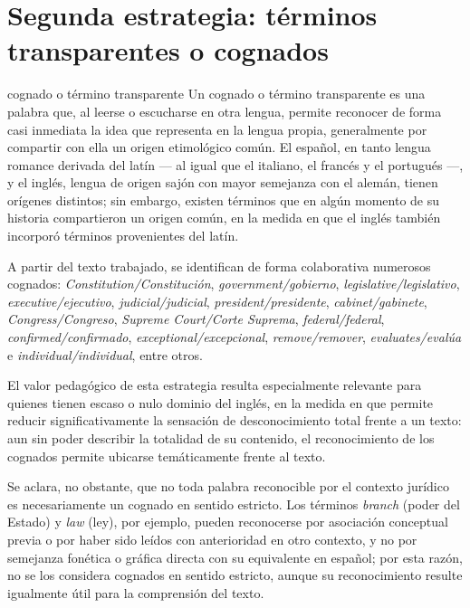 \documentclass[12pt,oneside]{book}
\begin{document}
\section{Segunda estrategia: términos transparentes o cognados}

\begin{definition}{cognado o término transparente}
Un cognado o término transparente es una palabra que, al leerse o escucharse en otra lengua, permite reconocer de forma casi inmediata la idea que representa en la lengua propia, generalmente por compartir con ella un origen etimológico común. El español, en tanto lengua romance derivada del latín --- al igual que el italiano, el francés y el portugués ---, y el inglés, lengua de origen sajón con mayor semejanza con el alemán, tienen orígenes distintos; sin embargo, existen términos que en algún momento de su historia compartieron un origen común, en la medida en que el inglés también incorporó términos provenientes del latín.
\end{definition}

A partir del texto trabajado, se identifican de forma colaborativa numerosos cognados: \textit{Constitution/Constitución}, \textit{government/gobierno}, \textit{legislative/legislativo}, \textit{executive/ejecutivo}, \textit{judicial/judicial}, \textit{president/presidente}, \textit{cabinet/gabinete}, \textit{Congress/Congreso}, \textit{Supreme Court/Corte Suprema}, \textit{federal/federal}, \textit{confirmed/confirmado}, \textit{exceptional/excepcional}, \textit{remove/remover}, \textit{evaluates/evalúa} e \textit{individual/individual}, entre otros.

El valor pedagógico de esta estrategia resulta especialmente relevante para quienes tienen escaso o nulo dominio del inglés, en la medida en que permite reducir significativamente la sensación de desconocimiento total frente a un texto: aun sin poder describir la totalidad de su contenido, el reconocimiento de los cognados permite ubicarse temáticamente frente al texto.

Se aclara, no obstante, que no toda palabra reconocible por el contexto jurídico es necesariamente un cognado en sentido estricto. Los términos \textit{branch} (poder del Estado) y \textit{law} (ley), por ejemplo, pueden reconocerse por asociación conceptual previa o por haber sido leídos con anterioridad en otro contexto, y no por semejanza fonética o gráfica directa con su equivalente en español; por esta razón, no se los considera cognados en sentido estricto, aunque su reconocimiento resulte igualmente útil para la comprensión del texto.
\end{document}

